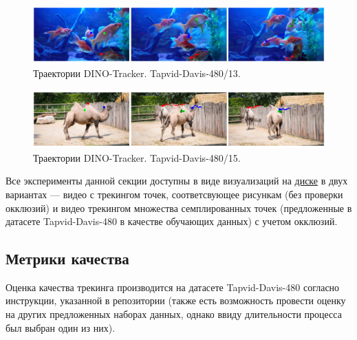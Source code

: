 \documentclass[a4paper, 14pt]{extarticle}
\theoremstyle{definition}
\theoremstyle{plain}
\theoremstyle{remark}
\begin{document}
\begin{figure}
    [H]
    \centering
    \includegraphics[width=\textwidth]{figs/davis-13.png}
    \caption{Траектории DINO-Tracker. Tapvid-Davis-480/13.}
    \label{fig:davis-13}
\end{figure}
\begin{figure}
    [H]
    \centering
    \includegraphics[width=\textwidth]{figs/davis-15.png}
    \caption{Траектории DINO-Tracker. Tapvid-Davis-480/15.}
    \label{fig:davis-15}
\end{figure}

Все эксперименты данной секции доступны в виде визуализаций на \href{https://drive.google.com/drive/folders/1lrNxilkdl0-vznN1TfMgSNOFz2cYQjS7?usp=drive_link}{диске} в двух вариантах --- видео с трекингом точек, соответсвующее рисункам (без проверки окклюзий) и видео трекингом множества семплированных точек (предложенные в датасете Tapvid-Davis-480 в качестве обучающих данных) с учетом окклюзий.

\subsection{Метрики качества}

Оценка качества трекинга производится на датасете Tapvid-Davis-480 согласно инструкции, указанной в репозитории (также есть возможность провести оценку на других предложенных наборах данных, однако ввиду длительности процесса был выбран один из них).
\end{document}
